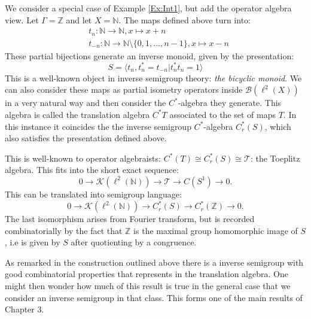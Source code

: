\begin{example}\label{Ex:Int2}
We consider a special case of Example \ref{Ex:Int1}, but add the operator algebra view. Let $\Gamma=\mathbb{Z}$ and let $X=\mathbb{N}$. The maps defined above turn into:
\begin{eqnarray*}
& t_{n}: \mathbb{N} \rightarrow \mathbb{N}, x \mapsto x+n \\
&t_{-n}: \mathbb{N} \rightarrow \mathbb{N}\setminus \lbrace 0,1,...,n-1 \rbrace , x \mapsto x-n
\end{eqnarray*} 
These partial bijections generate an inverse monoid, given by the presentation:
\begin{equation*}
S=\langle t_{n},t_{n}^{*}=t_{-n} | t_{n}^{*}t_{n}=1 \rangle
\end{equation*}
This is a well-known object in inverse semigroup theory: \textit{the bicyclic monoid}. We can also consider these maps as partial isometry operators inside $\mathcal{B}(\ell^{2}(X))$ in a very natural way and then consider the $C^{*}$-algebra they generate. This algebra is called the translation algebra $C^{*}T$ associated to the set of maps $T$. In this instance it coincides the the inverse semigroup $C^{*}$-algebra $C^{*}_{r}(S)$, which also satisfies the presentation defined above.

This is well-known to operator algebraists: $C^{*}(T)\cong C^{*}_{r}(S) \cong \mathcal{T}$: the Toeplitz algebra. This fits into the short exact sequence:
\begin{equation*}
0 \rightarrow \mathcal{K}(\ell^{2}(\mathbb{N})) \rightarrow \mathcal{T} \rightarrow C(S^{1}) \rightarrow 0.
\end{equation*}
This can be translated into semigroup language:
\begin{equation*}
0 \rightarrow \mathcal{K}(\ell^{2}(\mathbb{N})) \rightarrow C^{*}_{r}(S) \rightarrow C^{*}_{r}(\mathbb{Z}) \rightarrow 0.
\end{equation*}
The last isomorphism arises from Fourier transform, but is recorded combinatorially by the fact that $\mathbb{Z}$ is the maximal group homomorphic image of $S$, i.e is given by $S$ after quotienting by a congruence. 
\end{example}

As remarked in the construction outlined above there is a inverse semigroup with good combinatorial properties that represents in the translation algebra. One might then wonder how much of this result is true in the general case that we consider an inverse semigroup in that class. This forms one of the main results of Chapter 3.

